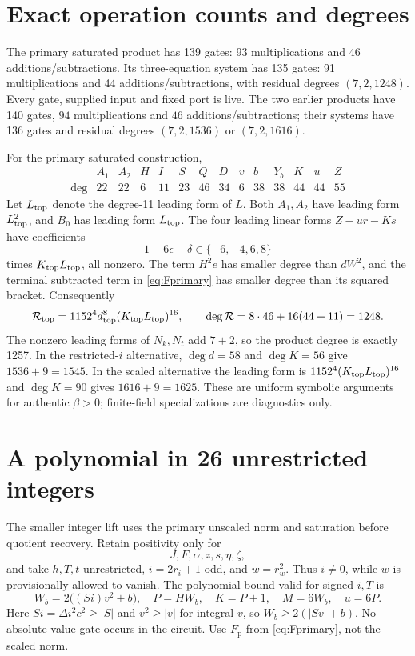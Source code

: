 \documentclass[11pt]{article}
\begin{document}
\section{Exact operation counts and degrees}\label{sec:degrees}

The primary saturated product has 139 gates: 93 multiplications and 46 additions/subtractions. Its three-equation system has 135 gates: 91 multiplications and 44 additions/subtractions, with residual degrees $(7,2,1248)$. Every gate, supplied input and fixed port is live. The two earlier products have 140 gates, $94$ multiplications and $46$ additions/subtractions; their systems have 136 gates and residual degrees $(7,2,1536)$ or $(7,2,1616)$.

For the primary saturated construction,
\[
\begin{array}{c|rrrrrrrrrrrrr}
 &A_1&A_2&H&I&S&Q&D&v&b&Y_b&K&u&Z\\\hline
\deg&22&22&6&11&23&46&34&6&38&38&44&44&55
\end{array}
\]
Let $L_{\rm top}$ denote the degree-11 leading form of $L$. Both $A_1,A_2$ have leading form $L_{\rm top}^2$, and $B_0$ has leading form $L_{\rm top}$. The four leading linear forms $Z-ur-Ks$ have coefficients
\[
 1-6\epsilon-\delta\in\{-6,-4,6,8\}
\]
times $K_{\rm top}L_{\rm top}$, all nonzero. The term $H^2e$ has smaller degree than $dW^2$, and the terminal subtracted term in \eqref{eq:Fprimary} has smaller degree than its squared bracket. Consequently
\[
 \mathcal R_{\rm top}=1152^4d_{\rm top}^{8}
 (K_{\rm top}L_{\rm top})^{16},\qquad
 \deg\mathcal R=8\cdot46+16(44+11)=1248.
\]
The nonzero leading forms of $N_k,N_t$ add $7+2$, so the product degree is exactly 1257. In the restricted-$i$ alternative, $\deg d=58$ and $\deg K=56$ give $1536+9=1545$. In the scaled alternative the leading form is $1152^4(K_{\rm top}L_{\rm top})^{16}$ and $\deg K=90$ gives $1616+9=1625$. These are uniform symbolic arguments for authentic $\beta>0$; finite-field specializations are diagnostics only.

\section{A polynomial in 26 unrestricted integers}\label{sec:integer26}

The smaller integer lift uses the primary unscaled norm and saturation before quotient recovery. Retain positivity only for
\[
 J,F,\alpha,z,s,\eta,\zeta,
\]
and take $h,T,t$ unrestricted, $i=2r_i+1$ odd, and $w=r_w^2$. Thus $i\ne0$, while $w$ is provisionally allowed to vanish. The polynomial bound valid for signed $i,T$ is
\begin{equation}\label{eq:signedbound}
 W_b=2\bigl((Si)v^2+b\bigr),\quad P=HW_b,\quad K=P+1,
 \quad M=6W_b,\quad u=6P.
\end{equation}
Here $Si=\Delta i^2c^2\ge|S|$ and $v^2\ge|v|$ for integral $v$, so $W_b\ge2(|Sv|+b)$. No absolute-value gate occurs in the circuit. Use $F_{\mathrm p}$ from \eqref{eq:Fprimary}, not the scaled norm.
\end{document}
